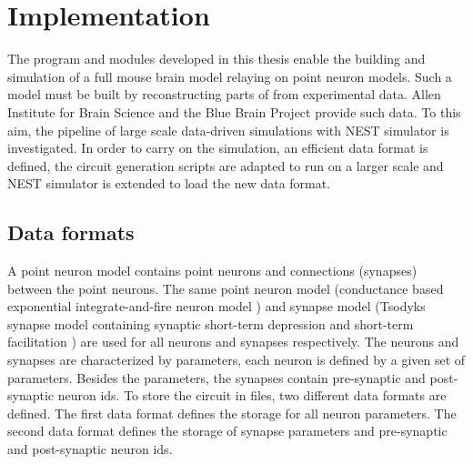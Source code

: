 %

\chapter{Implementation}

The program and modules developed in this thesis enable the building and simulation
of a full mouse brain model relaying on point neuron models. Such a model must be built by
reconstructing parts of from experimental data.
Allen Institute for Brain Science and the Blue Brain Project provide such data.
To this aim, the pipeline of large scale data-driven simulations with NEST simulator is investigated.
In order to carry on the simulation, an efficient data format is defined, the circuit generation scripts are adapted to
run on a larger scale and NEST simulator is extended to load the new data format.

\section{Data formats}
\label{sec:dataformats}
A point neuron model contains point neurons and connections (synapses) between the point neurons.
The same point neuron model (conductance based exponential integrate-and-fire neuron model \cite{brette2005adaptive}) and synapse model (Tsodyks synapse model containing synaptic short-term depression and short-term facilitation \cite{tsodyks1997neural, fuhrmann2002coding}) are used for all neurons and synapses respectively.
The neurons and synapses are characterized by parameters, each neuron is defined by a given set of parameters.
Besides the parameters, the synapses contain pre-synaptic and post-synaptic neuron ids.
To store the circuit in files, two different data formats are defined.
The first data format defines the storage for all neuron parameters.
The second data format defines the storage of synapse parameters and pre-synaptic and post-synaptic neuron ids.


